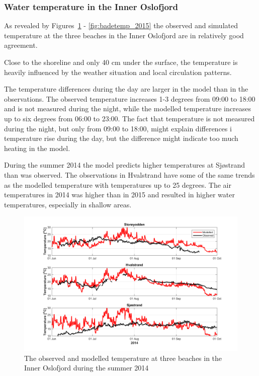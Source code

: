 \subsubsection{Water temperature in the Inner Oslofjord}
As revealed by Figures~\ref{fig:badetemp_2014} - \ref{fig:badetemp_2015} the observed and simulated temperature at the three beaches in the Inner Oslofjord are in relatively good agreement. 

Close to the shoreline and only 40 cm under the surface, the temperature is heavily influenced by the weather situation and local circulation patterns. 

The temperature differences during the day are larger in the model than in the observations. The observed temperature increases 1-3 degrees from 09:00 to 18:00 and is not measured during the night, while the modelled temperature increases up to six degrees from 06:00 to 23:00. The fact that temperature is not measured during the night, but only from 09:00 to 18:00, might explain differences i temperature rise during the day, but the difference might indicate too much heating in the model.


During the summer 2014 the model predicts higher temperatures at Sj\o strand than was observed. The observations in Hvalstrand have some of the same trends as the modelled temperature with temperatures up to 25 degrees. The air temperatures in 2014 was higher than in 2015 and resulted in higher water temperatures, especially in shallow areas. 

\begin{figure}[ht]
	\centerline{
		\includegraphics*[trim=0 0 0 0,clip=true,width=\textwidth]{Figurer/badetemp_2014}
		}
	\caption{\small The observed and modelled temperature at three beaches in the Inner Oslofjord during the summer 2014}
\label{fig:badetemp_2014}
\end{figure}

